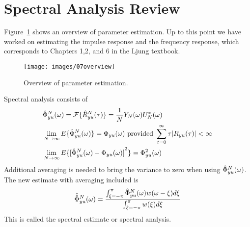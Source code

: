 \mainmatter%
\setcounter{page}{1}

\lectureseries[\course]{\course}

\date{October 15, 2009}

\setaddress%

\setcounter{lecture}{6}
\setcounter{chapter}{6}

\label{lec:7}

\section{Spectral Analysis Review}
Figure~\ref{fig:07overview} shows an overview of parameter estimation.
Up to this point we have worked on estimating the impulse response and the frequency response, which corresponds to Chapters 1,2, and 6 in the Ljung textbook.

\begin{figure}[ht!]
\centering
\texttt{[image: images/07overview]}
\caption{Overview of parameter estimation.}
\label{fig:07overview}
\end{figure}

Spectral analysis consists of
\begin{align*}
&\hat{\Phi}_{yu}^N (\omega) = \mathcal{F}\{\hat{R}_{yu}^N (\tau)\} = \frac{1}{N}Y_N(\omega)U_N^*(\omega) \\
&\lim_{N\to\infty}E\{\hat{\Phi}_{yu}^N (\omega)\} = \Phi_{yu}(\omega) \text{~provided~} \sum_{t=0}^\infty \tau|R_{yu}(\tau)| < \infty \\
&\lim_{N\to\infty}E\{{[\hat{\Phi}_{yu}^N (\omega) - \Phi_{yu}(\omega)]}^2\} = \Phi_{yu}^2(\omega)
\end{align*}
Additional averaging is needed to bring the variance to zero when using $\hat{\Phi}_{yu}^N (\omega)$.
The new estimate with averaging included is
$$\hat{\hat{\Phi}}_{yu}^N (\omega) = \frac{\int_{\xi=-\pi}^\pi \hat{\Phi}_{yu}^N (\omega) w(\omega-\xi)d\xi}{\int_{\xi=-\pi}^\pi w(\xi)d\xi}$$
This is called the spectral estimate or spectral analysis.

